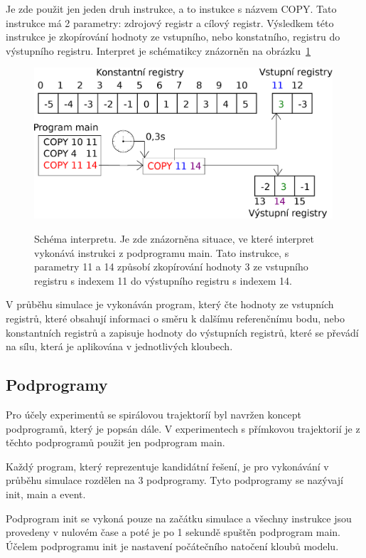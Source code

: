 Je zde použit jen jeden druh instrukce, a to instukce s názvem COPY\@.
Tato instrukce má 2 parametry: zdrojový registr a cílový registr.
Výsledkem této instrukce je zkopírování hodnoty ze vstupního, nebo konstatního, registru do výstupního registru.
Interpret je schématikcy znázorněn na obrázku~\ref{fig:interpret}

\begin{figure}[h]
    \centering
    {\includegraphics[width=30em]{obrazky/interpret.eps}}
    \caption{
    Schéma interpretu.
    Je zde znázorněna situace, ve které interpret vykonává instrukci z podprogramu main.
    Tato instrukce, s parametry 11 a 14 způsobí zkopírování hodnoty 3 ze vstupního registru s indexem 11 do výstupního registru s indexem 14.
    }
    \label{fig:interpret}
\end{figure}

V průběhu simulace je vykonáván program, který čte hodnoty ze vstupních registrů, které obsahují informaci o směru k dalšímu referenčnímu bodu, nebo konstantních registrů a zapisuje hodnoty do výstupních registrů, které se převádí na sílu, která je aplikována v jednotlivých kloubech.

\subsection{Podprogramy}

Pro účely experimentů se spirálovou trajektoríí byl navržen koncept podprogramů, který je popsán dále.
V experimentech s přímkovou trajektorií je z těchto podprogramů použit jen podprogram main.

Každý program, který reprezentuje kandidátní řešení, je pro vykonávání v průběhu simulace rozdělen na 3 podprogramy.
Tyto podprogramy se nazývají init, main a event.

Podprogram init se vykoná pouze na začátku simulace a všechny instrukce jsou provedeny v nulovém čase a poté je po 1 sekundě spuštěn podprogram main.
Účelem podprogramu init je nastavení počátečního natočení kloubů modelu.

